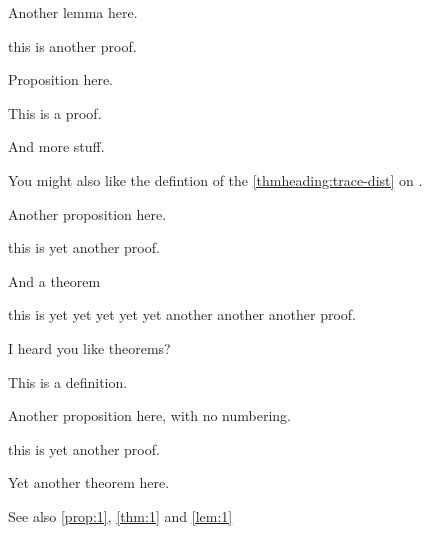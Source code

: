 \documentclass[12pt,a5paper]{article}
\begin{document}
\begin{lemma}
\label{lem:1}
Another lemma here.
\end{lemma}
\begin{myproof}
  this is another proof.
\end{myproof}


\begin{proposition}
  \label{prop:1}
  Proposition here.
\end{proposition}
\begin{myotherproofstyle}[*prop:1]
  This is a proof.

  And more stuff.
\end{myotherproofstyle}


You might also like the defintion of the \ref{thmheading:trace-dist} on .

\begin{proposition}
\noproofref
Another proposition here.
\end{proposition}
\begin{myproof}
  this is yet another proof.
\end{myproof}


\begin{theorem}
\label{thm:1}
And a theorem
\end{theorem}
\begin{myotherproofstyle}
  this is yet yet yet yet yet another another another proof.
\end{myotherproofstyle}


\begin{theorem}
\noproofref
\label{thm:2}
I heard you like theorems?
\end{theorem}

\begin{definition*}
\label{def:1}
This is a definition.
\end{definition*}


\begin{proposition*}
Another proposition here, with no numbering.
\end{proposition*}
\begin{myproof}
  this is yet another proof.
\end{myproof}

\begin{theorem}
  \label{thm:another}
  Yet another theorem here.
\end{theorem}


See also \autoref{prop:1}, \autoref{thm:1} and \autoref{lem:1}
\end{document}
